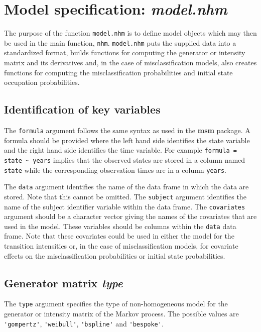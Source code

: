 \documentclass{article}
\numberwithin{equation}{section}
\begin{document}
\section{Model specification: {\it model.nhm}}
\label{model_spec}

The purpose of the function \verb!model.nhm! is to define model objects which may then be used in the main function, \verb!nhm!. \verb!model.nhm! puts the supplied data into a standardized format, builds functions for computing the generator or intensity matrix and its derivatives and, in the case of misclassification models, also creates functions for computing the misclassification probabilities and initial state occupation probabilities. 

\subsection{Identification of key variables}

The \verb!formula! argument follows the same syntax as used in the {\bf msm} package. A formula should be provided where the left hand side identifies the state variable and the right hand side identifies the time variable. For example \verb!formula = state ~ years! implies that the observed states are stored in a column named \verb!state! while the corresponding observation times are in a column \verb!years!. 

The \verb!data! argument identifies the name of the data frame in which the data are stored. Note that this cannot be omitted. The \verb!subject! argument identifies the name of the subject identifier variable within the data frame. The \verb!covariates! argument should be a character vector giving the names of the covariates that are used in the model. These variables should be columns within the \verb!data! data frame. Note that these covariates could be used in either the model for the transition intensities or, in the case of misclassification models, for covariate effects on the misclassification probabilities or initial state probabilities.

\subsection{Generator matrix {\it type}}

The \verb!type! argument specifies the type of non-homogeneous model for the generator or intensity matrix of the Markov process. The possible values are \verb!'gompertz'!, \verb!'weibull'!, \verb!'bspline'! and \verb!'bespoke'!.
\end{document}
